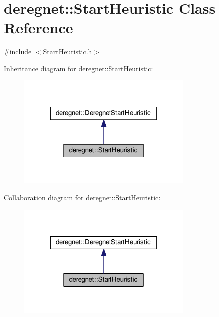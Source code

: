 \hypertarget{classderegnet_1_1StartHeuristic}{}\section{deregnet\+:\+:Start\+Heuristic Class Reference}
\label{classderegnet_1_1StartHeuristic}


{\ttfamily \#include $<$Start\+Heuristic.\+h$>$}



Inheritance diagram for deregnet\+:\+:Start\+Heuristic\+:\nopagebreak
\begin{figure}[H]
\begin{center}
\leavevmode
\includegraphics[width=240pt]{classderegnet_1_1StartHeuristic__inherit__graph}
\end{center}
\end{figure}


Collaboration diagram for deregnet\+:\+:Start\+Heuristic\+:\nopagebreak
\begin{figure}[H]
\begin{center}
\leavevmode
\includegraphics[width=240pt]{classderegnet_1_1StartHeuristic__coll__graph}
\end{center}
\end{figure}
